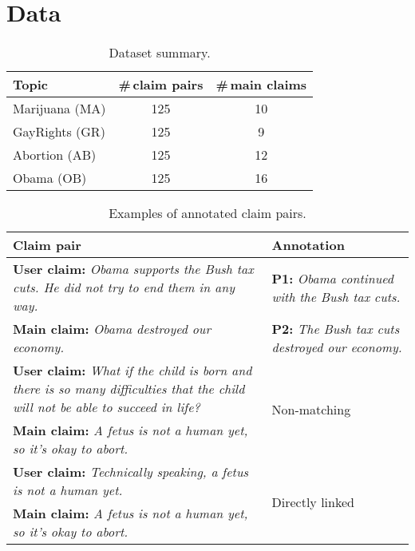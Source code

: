 \section{Data}
\label{sec:argpremise_dataset}

\begin{table}
\begin{center}
{\small
\begin{tabular}{lcc}
\toprule
Topic & \#\,claim pairs  & \#\,main claims \\
\midrule
Marijuana (MA)	   & 125                     &  10                    \\
GayRights (GR)	   & 125                     &  9                     \\
Abortion (AB)	   & 125                     &  12                    \\
Obama (OB)	       & 125                     &  16 \\
\bottomrule
\end{tabular}}
\caption{Dataset summary. }
\label{tab:argpremise_topic_distribution}
\end{center}
\end{table}


\begin{table}
{\small
\begin{tabular}{@{}p{}p{}@{}}
\toprule
Claim pair & Annotation            \\
\midrule
 \textbf{User claim:} \emph{Obama supports the Bush tax cuts. He did not try to
	end them in any way.} & \textbf{P1:}  \emph{Obama continued with the
	Bush tax cuts.}      \\
 \textbf{Main claim:} \emph{Obama destroyed our economy.}  & \textbf{P2:}
	\emph{The Bush tax cuts destroyed our economy.}   \\
\midrule
 \textbf{User claim:} \emph{What if the child is born and there is so many
	difficulties that the child will not be able to succeed in life?}  &
	\multirow{2}{*}{Non-matching}   \\
 \textbf{Main claim:} \emph{A fetus is not a human yet, so it's okay to abort.}
	&   \\
\midrule
 \textbf{User claim:} \emph{Technically speaking, a fetus is not a human yet.} & \multirow{2}{*}{Directly linked}      \\
 \textbf{Main claim:} \emph{A fetus is not a human yet, so it's okay to abort.}     & \\
\bottomrule
\end{tabular}}
\caption{Examples of annotated claim pairs.}
\label{tab:argpremises_example}
\end{table}

